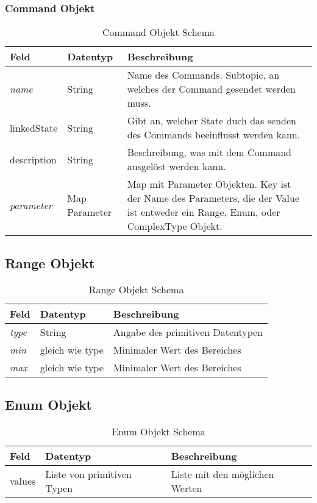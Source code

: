 \subsubsection{Command Objekt}
\begin{table}[H]
\begin{tabularx}{\textwidth}{|l|l|X|}

 \hline
 {\bf Feld } & {\bf Datentyp } & {\bf Beschreibung } \\  \hline
 
 \textit{name}  &   String   &  Name des Commands. Subtopic, an welches der Command gesendet werden muss. \\ \hline
 linkedState  &   String   &  Gibt an, welcher State duch das senden des Commands beeinflusst werden kann. \\ \hline
 description  &   String   &  Beschreibung, was mit dem Command ausgelöst werden kann.  \\ \hline
 \textit{parameter}       &   Map Parameter & Map mit Parameter Objekten. Key ist der Name des Parameters, die der Value ist entweder ein Range, Enum, oder ComplexType Objekt.\\ \hline
\end{tabularx}
\caption{Command Objekt Schema}
\end{table}




\subsection{Range Objekt}

\begin{table}[H]
\begin{tabularx}{\textwidth}{|l|l|X|}

 \hline
 {\bf Feld } & {\bf Datentyp } & {\bf Beschreibung } \\  \hline

 \textit{type}  &  String   & Angabe des primitiven Datentypen        \\ \hline
 \textit{min}   &  gleich wie type   & Minimaler Wert des Bereiches   \\ \hline
 \textit{max}   &  gleich wie type   & Minimaler Wert des Bereiches   \\ \hline

\end{tabularx}
\caption{Range Objekt Schema}
\end{table}

\subsection{Enum Objekt}

\begin{table}[H]
\begin{tabularx}{\textwidth}{|l|l|X|}

 \hline
 {\bf Feld } & {\bf Datentyp } & {\bf Beschreibung } \\  \hline

 values  &   Liste von primitiven Typen   & Liste mit den möglichen Werten   \\ \hline

\end{tabularx}
\caption{Enum Objekt Schema}
\end{table}

